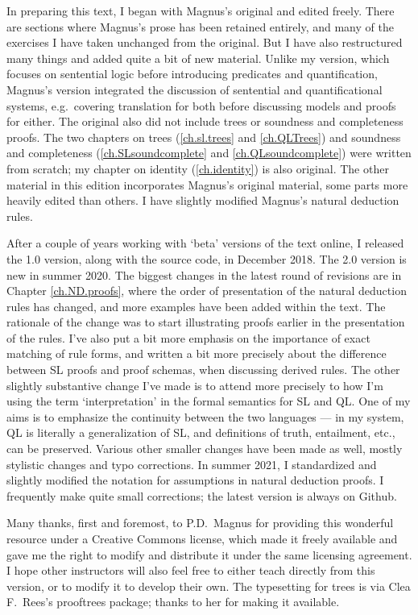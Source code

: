 In preparing this text, I began with Magnus's original and edited freely. There are sections where Magnus's prose has been retained entirely, and many of the exercises I have taken unchanged from the original. But I have also restructured many things and added quite a bit of new material. Unlike my version, which focuses on sentential logic before introducing predicates and quantification, Magnus's version integrated the discussion of sentential and quantificational systems, e.g.\ covering translation for both before discussing models and proofs for either. The original also did not include trees or soundness and completeness proofs. The two chapters on trees (\ref{ch.sl.trees} and \ref{ch.QLTrees}) and soundness and completeness (\ref{ch.SLsoundcomplete} and \ref{ch.QLsoundcomplete}) were written from scratch; my chapter on identity (\ref{ch.identity}) is also original. The other material in this edition incorporates Magnus's original material, some parts more heavily edited than others. I have slightly modified Magnus's natural deduction rules.

After a couple of years working with `beta' versions of the text online, I released the 1.0 version, along with the source code, in December 2018. The 2.0 version is new in summer 2020. The biggest changes in the latest round of revisions are in Chapter \ref{ch.ND.proofs}, where the order of presentation of the natural deduction rules has changed, and more examples have been added within the text. The rationale of the change was to start illustrating proofs earlier in the presentation of the rules. I've also put a bit more emphasis on the importance of exact matching of rule forms, and written a bit more precisely about the difference between SL proofs and proof schemas, when discussing derived rules. The other slightly substantive change I've made is to attend more precisely to how I'm using the term `interpretation' in the formal semantics for SL and QL. One of my aims is to emphasize the continuity between the two languages --- in my system, QL is literally a generalization of SL, and definitions of truth, entailment, etc., can be preserved. Various other smaller changes have been made as well, mostly stylistic changes and typo corrections. In summer 2021, I standardized and slightly modified the notation for assumptions in natural deduction proofs. I frequently make quite small corrections; the latest version is always on Github.

Many thanks, first and foremost, to P.D.\ Magnus for providing this wonderful resource under a Creative Commons license, which made it freely available and gave me the right to modify and distribute it under the same licensing agreement. I hope other instructors will also feel free to either teach directly from this version, or to modify it to develop their own. The typesetting for trees is via Clea F.\ Rees's prooftrees package; thanks to her for making it available.

